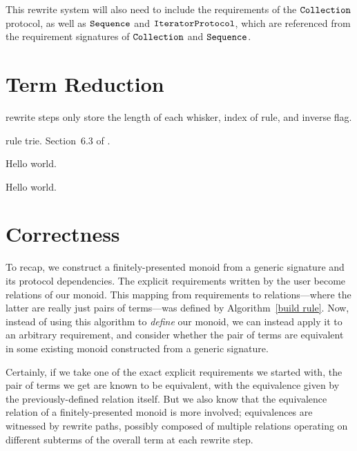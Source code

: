 \documentclass[../generics]{subfiles}
\begin{document}
This rewrite system will also need to include the requirements of the $\texttt{Collection}$ protocol, as well as $\texttt{Sequence}$ and $\texttt{IteratorProtocol}$, which are referenced from the requirement signatures of $\texttt{Collection}$ and $\texttt{Sequence}$.

\section{Term Reduction}\label{term reduction}


rewrite steps only store the length of each whisker, index of rule, and inverse flag.

rule trie. Section~6.3 of \cite{art3}.

\begin{algorithm}\label{trie insert algo}
\end{algorithm}

\begin{algorithm}\label{trie lookup algo}
Hello world.
\end{algorithm}

\begin{algorithm}\label{term reduction trie algo}
Hello world.
\end{algorithm}

\section{Correctness}

To recap, we construct a finitely-presented monoid from a generic signature and its protocol dependencies. The explicit requirements written by the user become relations of our monoid. This mapping from requirements to relations---where the latter are really just pairs of terms---was defined by Algorithm~\ref{build rule}. Now, instead of using this algorithm to \emph{define} our monoid, we can instead apply it to an arbitrary requirement, and consider whether the pair of terms are equivalent in some existing monoid constructed from a generic signature.

Certainly, if we take one of the exact explicit requirements we started with, the pair of terms we get are known to be equivalent, with the equivalence given by the previously-defined relation itself. But we also know that the equivalence relation of a finitely-presented monoid is more involved; equivalences are witnessed by rewrite paths, possibly composed of multiple relations operating on different subterms of the overall term at each rewrite step.
\end{document}

